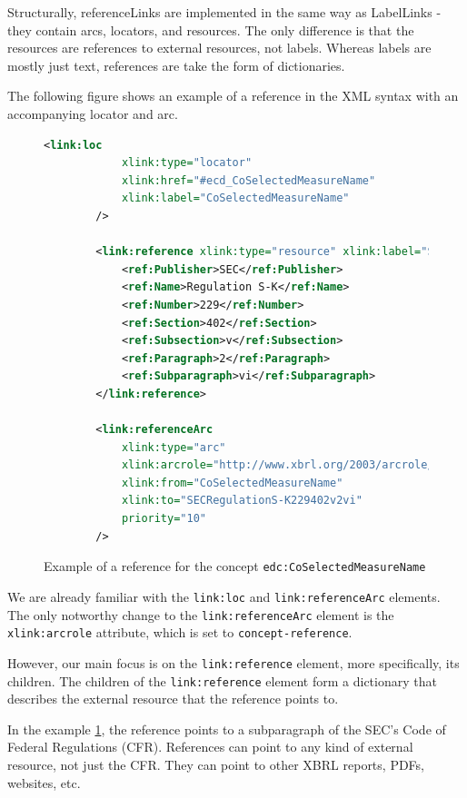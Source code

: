 Structurally, referenceLinks are implemented in the same way as LabelLinks - they contain arcs, locators, and resources.
The only difference is that the resources are references to external resources, not labels.
Whereas labels are mostly just text, references are take the form of dictionaries.

The following figure shows an example of a reference in the XML syntax with an accompanying locator and arc.

\begin{figure}[H]
    \begin{lstlisting}[language=XML]
        <link:loc 
            xlink:type="locator" 
            xlink:href="#ecd_CoSelectedMeasureName" 
            xlink:label="CoSelectedMeasureName"
        />
        
        <link:reference xlink:type="resource" xlink:label="SECRegulationS-K229402v2vi" xlink:role="http://www.xbrl.org/2003/role/presentationRef">
            <ref:Publisher>SEC</ref:Publisher>
            <ref:Name>Regulation S-K</ref:Name>
            <ref:Number>229</ref:Number>
            <ref:Section>402</ref:Section>
            <ref:Subsection>v</ref:Subsection>
            <ref:Paragraph>2</ref:Paragraph>
            <ref:Subparagraph>vi</ref:Subparagraph>
        </link:reference>
        
        <link:referenceArc 
            xlink:type="arc" 
            xlink:arcrole="http://www.xbrl.org/2003/arcrole/concept-reference" 
            xlink:from="CoSelectedMeasureName" 
            xlink:to="SECRegulationS-K229402v2vi" 
            priority="10"
        />
    \end{lstlisting}
    \caption{Example of a reference for the concept \texttt{edc:CoSelectedMeasureName}}
    \label{fig:example_reference_xml}
\end{figure}

We are already familiar with the \texttt{link:loc} and \texttt{link:referenceArc} elements. 
The only notworthy change to the \texttt{link:referenceArc} element is the \texttt{xlink:arcrole} attribute, which is set to \texttt{concept-reference}.

However, our main focus is on the \texttt{link:reference} element, more specifically, its children.
The children of the \texttt{link:reference} element form a dictionary that describes the external resource that the reference points to.

In the example \ref{fig:example_reference_xml}, the reference points to a subparagraph of the SEC's Code of Federal Regulations (CFR).
References can point to any kind of external resource, not just the CFR.
They can point to other XBRL reports, PDFs, websites, etc.

